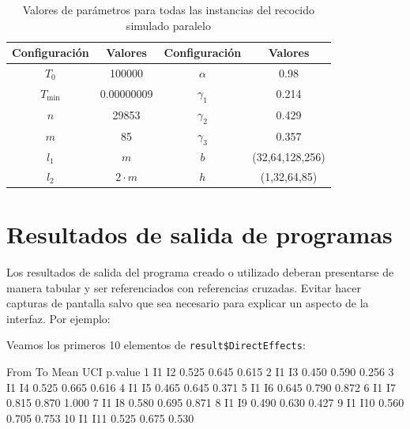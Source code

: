 \begin{table}
    \centering
    \caption{Valores de parámetros para todas las instancias del recocido simulado paralelo}\label{tab:parametros_recocido_simulado}
    \begin{tabular}{|c|c|c|c|}
        \hline
        \textbf{Configuración} & \textbf{Valores}  & \textbf{Configuración} & \textbf{Valores}\\
        \hline
        $T_{0}$ & 100000 & $\alpha$ & 0.98\\
        $T_{\min}$ & 0.00000009 & $\gamma_1$ & 0.214 \\
        $n$ & 29853 & $\gamma_2$ & 0.429 \\
        $m$ & 85  & $\gamma_3$ & 0.357\\
        $l_{1}$ & $m$ &  $b$ & (32,64,128,256)\\ 
        $l_{2}$ & $2\cdot m$ & $h$ & (1,32,64,85) \\
        \hline
    \end{tabular}
\end{table}

\section{Resultados de salida de programas}
Los resultados de salida del programa creado o utilizado deberan presentarse de manera tabular y ser referenciados con referencias cruzadas. Evitar hacer capturas de pantalla salvo que sea necesario para explicar un aspecto de la interfaz. Por ejemplo:

Veamos los primeros 10 elementos de \texttt{result\$DirectEffects}:
\begin{example}
   From  To  Mean   UCI p.value
1    I1  I2 0.525 0.645   0.615
2    I1  I3 0.450 0.590   0.256
3    I1  I4 0.525 0.665   0.616
4    I1  I5 0.465 0.645   0.371
5    I1  I6 0.645 0.790   0.872
6    I1  I7 0.815 0.870   1.000
7    I1  I8 0.580 0.695   0.871
8    I1  I9 0.490 0.630   0.427
9    I1 I10 0.560 0.705   0.753
10   I1 I11 0.525 0.675   0.530
\end{example}

